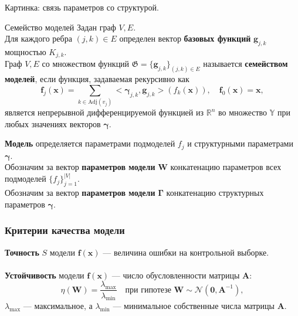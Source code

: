 \documentclass[usenames,dvipsnames,11pt,pdf,utf8,russian,aspectratio=169]{beamer}
\begin{document}
\begin{frame}{}
Картинка: связь параметров со структурой.
\end{frame}

\begin{frame}{ Семейство моделей}
Задан граф $V,E$. \\
Для каждого ребра $(j,k) \in E$ определен вектор \textbf{базовых функций} $\mathbf{g}_{j,k}$ мощностью $K_{j,k}$.\\
Граф $V, E$ со множеством функций $\mathfrak{G} = \{\mathbf{g}_{j,k}\}_{(j,k) \in E}$ называется \textbf{семейством моделей}, если функция, задаваемая рекурсивно как 
\[
    \mathbf{f}_j(\mathbf{x}) = \sum_{k \in \text{Adj}(v_j)} <\boldsymbol{\gamma}_{j,k}, \mathbf{g}_{j,k}> (f_{k}(\mathbf{x})), \quad     \mathbf{f}_0(\mathbf{x}) = \mathbf{x},
\]
является непрерывной дифференцируемой функцией из $\mathbb{R}^n$ во множество $\mathbb{Y}$ при любых значениях векторов $\boldsymbol{\gamma}$.

\textbf{Модель} определяется параметрами подмоделей $f_j$ и структурными параметрами  $\boldsymbol{\gamma}$.\\
Обозначим за вектор \textbf{параметров модели}  $\mathbf{W}$ конкатенацию параметров всех подмоделей $\{f_j\}_{j=1}^{|V|}$.\\
Обозначим за вектор \textbf{параметров модели}  $\boldsymbol{\Gamma}$ конкатенацию структурных параметров $\boldsymbol{\gamma}$.
\end{frame}




\begin{frame}
\frametitle{Критерии качества модели}

\textbf{Точность} $S$ модели $\mathbf{f}(\mathbf{x})$ --- величина ошибки на контрольной выборке.
~\\
~\\
\textbf{Устойчивость} модели $\mathbf{f}(\mathbf{x})$ --- число обусловленности матрицы $\mathbf{A}$:
$$\eta(\mathbf{{W}})=\frac{\lambda_{\max}}{\lambda_{\min}} \quad\text{при гипотезе } 	\mathbf{W} \sim \mathcal{N}(\mathbf{0},\mathbf{A}^{-1}),$$  $\lambda_{\max}$ --- максимальное, а $\lambda_{\min}$ --- минимальное собственные числа матрицы $\mathbf{A}$.





\end{frame}
\end{document}
